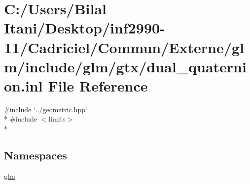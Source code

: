 \hypertarget{dual__quaternion_8inl}{}\section{C\+:/\+Users/\+Bilal Itani/\+Desktop/inf2990-\/11/\+Cadriciel/\+Commun/\+Externe/glm/include/glm/gtx/dual\+\_\+quaternion.inl File Reference}
\label{dual__quaternion_8inl}
{\ttfamily \#include \char`\"{}../geometric.\+hpp\char`\"{}}\\*
{\ttfamily \#include $<$limits$>$}\\*
\subsection*{Namespaces}
\begin{DoxyCompactItemize}
\item 
 \hyperlink{namespaceglm}{glm}
\end{DoxyCompactItemize}
